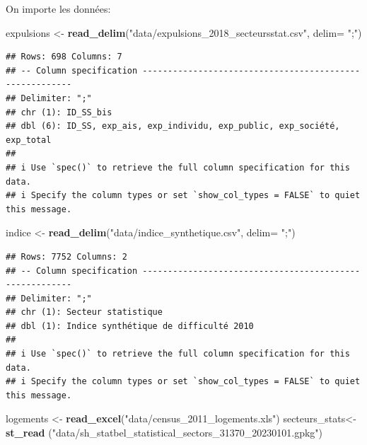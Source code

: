 \documentclass[
]{book}
\newenvironment{Shaded}{\begin{snugshade}}{\end{snugshade}}
\newcommand{\AttributeTok}[1]{\textcolor[rgb]{0.13,0.29,0.53}{#1}}
\newcommand{\FunctionTok}[1]{\textcolor[rgb]{0.13,0.29,0.53}{\textbf{#1}}}
\newcommand{\NormalTok}[1]{#1}
\newcommand{\OtherTok}[1]{\textcolor[rgb]{0.56,0.35,0.01}{#1}}
\newcommand{\StringTok}[1]{\textcolor[rgb]{0.31,0.60,0.02}{#1}}
\begin{document}
On importe les données:

\begin{Shaded}
\begin{Highlighting}[]
\NormalTok{expulsions }\OtherTok{\textless{}{-}} \FunctionTok{read\_delim}\NormalTok{(}\StringTok{"data/expulsions\_2018\_secteursstat.csv"}\NormalTok{, }\AttributeTok{delim=} \StringTok{";"}\NormalTok{)}
\end{Highlighting}
\end{Shaded}

\begin{verbatim}
## Rows: 698 Columns: 7
## -- Column specification --------------------------------------------------------
## Delimiter: ";"
## chr (1): ID_SS_bis
## dbl (6): ID_SS, exp_ais, exp_individu, exp_public, exp_société, exp_total
## 
## i Use `spec()` to retrieve the full column specification for this data.
## i Specify the column types or set `show_col_types = FALSE` to quiet this message.
\end{verbatim}

\begin{Shaded}
\begin{Highlighting}[]
\NormalTok{indice }\OtherTok{\textless{}{-}} \FunctionTok{read\_delim}\NormalTok{(}\StringTok{"data/indice\_synthetique.csv"}\NormalTok{, }\AttributeTok{delim=} \StringTok{";"}\NormalTok{)}
\end{Highlighting}
\end{Shaded}

\begin{verbatim}
## Rows: 7752 Columns: 2
## -- Column specification --------------------------------------------------------
## Delimiter: ";"
## chr (1): Secteur statistique
## dbl (1): Indice synthétique de difficulté 2010
## 
## i Use `spec()` to retrieve the full column specification for this data.
## i Specify the column types or set `show_col_types = FALSE` to quiet this message.
\end{verbatim}

\begin{Shaded}
\begin{Highlighting}[]
\NormalTok{logements }\OtherTok{\textless{}{-}} \FunctionTok{read\_excel}\NormalTok{(}\StringTok{"data/census\_2011\_logements.xls"}\NormalTok{)}
\NormalTok{secteurs\_stats}\OtherTok{\textless{}{-}} \FunctionTok{st\_read}\NormalTok{ (}\StringTok{"data/sh\_statbel\_statistical\_sectors\_31370\_20230101.gpkg"}\NormalTok{)}
\end{Highlighting}
\end{Shaded}
\end{document}

